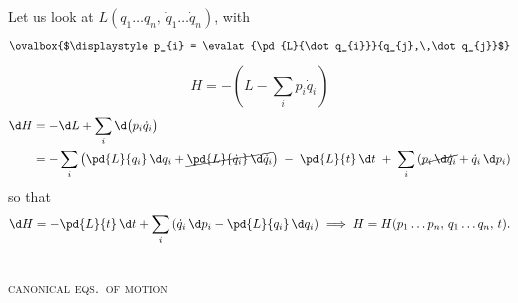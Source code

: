 \documentclass[11pt]{article}
\begin{document}
\medskip\noindent Let us look at $L(q_{1}\ldots q_{n},\,\dot q_{1}\ldots \dot q_{n})$, with
\[
\ovalbox{$\displaystyle p_{i} = \evalat{\pd{L}{\dot q_{i}}}{q_{j},\,\dot q_{j}}$}
\]
\[
H = -\left(L - \sum_{i} p_{i}\dot q_{i}\right)
\]
\begin{align*}
\d H &= -\d L + \sum_{i} \d\bigl(p_{i}\dot q_{i}\bigr)\\
     &= -\sum_{i}\left(\pd{L}{q_{i}}\,\d q_{i}
        + \cancel{\pd{L}{\dot q_{i}}\,\d\dot q_{i}}\right)
        \;-\;\pd{L}{t}\,\d t\;
        +\;\sum_{i}\left(\cancel{p_{i}\,\d\dot q_{i}} + \dot q_{i}\,\d p_{i}\right)
\end{align*}
so that
\[
\d H = -\pd{L}{t}\,\d t + \sum_{i}\left(\dot q_{i}\,\d p_{i}
  - \pd{L}{q_{i}}\,\d q_{i}\right)
\;\Longrightarrow\;
H = H(p_{1}\ldots p_{n},\, q_{1}\ldots q_{n},\, t).
\]

\begin{center}
\\[3pt]
\textsc{canonical eqs.\ of motion}
\end{center}
\end{document}
